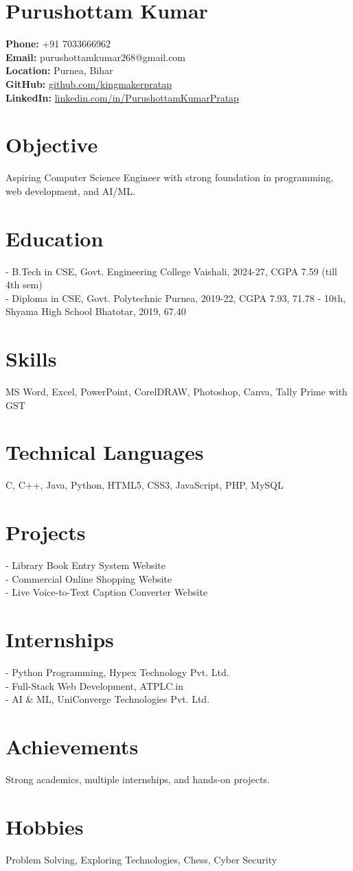 \documentclass[a4paper,10pt]{article}
\begin{document}
\section*{Purushottam Kumar}
\textbf{Phone:} +91 7033666962 \\
\textbf{Email:} purushottamkumar268@gmail.com \\
\textbf{Location:} Purnea, Bihar \\
\textbf{GitHub:} \href{https://github.com/kingmakerpratap}{github.com/kingmakerpratap} \\
\textbf{LinkedIn:} \href{https://www.linkedin.com/in/PurushottamKumarPratap}{linkedin.com/in/PurushottamKumarPratap}

\section*{Objective}
Aspiring Computer Science Engineer with strong foundation in programming, web development, and AI/ML.

\section*{Education}
- B.Tech in CSE, Govt. Engineering College Vaishali, 2024-27, CGPA 7.59 (till 4th sem) \\
- Diploma in CSE, Govt. Polytechnic Purnea, 2019-22, CGPA 7.93, 71.78%
- 10th, Shyama High School Bhatotar, 2019, 67.40%

\section*{Skills}
MS Word, Excel, PowerPoint, CorelDRAW, Photoshop, Canva, Tally Prime with GST

\section*{Technical Languages}
C, C++, Java, Python, HTML5, CSS3, JavaScript, PHP, MySQL

\section*{Projects}
- Library Book Entry System Website \\
- Commercial Online Shopping Website \\
- Live Voice-to-Text Caption Converter Website

\section*{Internships}
- Python Programming, Hypex Technology Pvt. Ltd. \\
- Full-Stack Web Development, ATPLC.in \\
- AI & ML, UniConverge Technologies Pvt. Ltd.

\section*{Achievements}
Strong academics, multiple internships, and hands-on projects.

\section*{Hobbies}
Problem Solving, Exploring Technologies, Chess, Cyber Security
\end{document}

